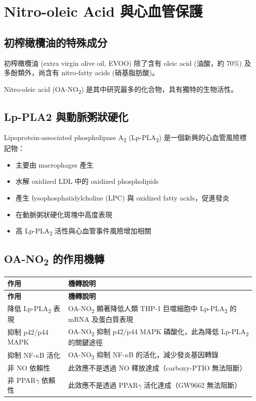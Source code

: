 \documentclass[12pt,a4paper]{article}
\begin{document}
\section{Nitro-oleic Acid 與心血管保護}

\subsection{初榨橄欖油的特殊成分}

初榨橄欖油 (extra virgin olive oil, EVOO) 除了含有 oleic acid (油酸，約 70\%) 及多酚類外，尚含有 nitro-fatty acids (硝基脂肪酸)。

Nitro-oleic acid (OA-NO\textsubscript{2}) 是其中研究最多的化合物，具有獨特的生物活性。

\subsection{Lp-PLA2 與動脈粥狀硬化}

Lipoprotein-associated phospholipase A\textsubscript{2} (Lp-PLA\textsubscript{2}) 是一個新興的心血管風險標記物：

\begin{itemize}
    \item 主要由 macrophages 產生
    \item 水解 oxidized LDL 中的 oxidized phospholipids
    \item 產生 lysophosphatidylcholine (LPC) 與 oxidized fatty acids，促進發炎
    \item 在動脈粥狀硬化斑塊中高度表現
    \item 高 Lp-PLA\textsubscript{2} 活性與心血管事件風險增加相關
\end{itemize}

\subsection{OA-NO\textsubscript{2} 的作用機轉}

\begin{longtable}{p{4cm}p{10cm}}
\toprule
\textbf{作用} & \textbf{機轉說明} \\
\midrule
\endfirsthead
\toprule
\textbf{作用} & \textbf{機轉說明} \\
\midrule
\endhead
\bottomrule
\endfoot

降低 Lp-PLA\textsubscript{2} 表現 & OA-NO\textsubscript{2} 顯著降低人類 THP-1 巨噬細胞中 Lp-PLA\textsubscript{2} 的 mRNA 及蛋白質表現 \\
\midrule
抑制 p42/p44 MAPK & OA-NO\textsubscript{2} 抑制 p42/p44 MAPK 磷酸化，此為降低 Lp-PLA\textsubscript{2} 的關鍵途徑 \\
\midrule
抑制 NF-$\kappa$B 活化 & OA-NO\textsubscript{2} 抑制 NF-$\kappa$B 的活化，減少發炎基因轉錄 \\
\midrule
非 NO 依賴性 & 此效應不是透過 NO 釋放達成（carboxy-PTIO 無法阻斷） \\
\midrule
非 PPAR$\gamma$ 依賴性 & 此效應不是透過 PPAR$\gamma$ 活化達成（GW9662 無法阻斷） \\
\bottomrule
\end{longtable}
\end{document}
